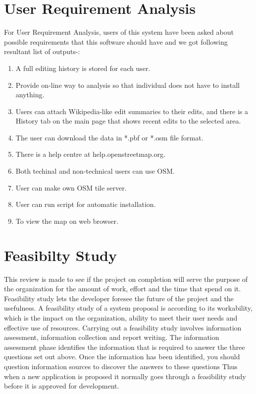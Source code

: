 \section{User Requirement Analysis}
For User Requirement Analysis, users of this system have been asked about
possible requirements that this software should have and we got following
resultant list of outputs-:
\begin{enumerate}
\item A full editing history is stored for each user.
\item Provide on-line way to analysis so that individual does not have to
install anything.
\item Users can attach Wikipedia-like edit summaries to their edits, and there is a History tab on the main page that shows recent edits to the selected area.
\item The user can download the data in *.pbf or *.osm file format.
\item There is a help centre at help.openstreetmap.org.
\item Both techinal and non-technical users can use OSM.
\item User can make own OSM tile server.
\item User can run script for automatic installation.
\item To view the map on web browser.

\end{enumerate}



\section{Feasibilty Study}
This review is made to see if the project on completion will serve the purpose of the organization for the amount of work, effort and the time that spend on it. Feasibility study lets the developer foresee the future of the project and the usefulness. A feasibility study of a system proposal is according to its workability, which is the impact on the organization, ability to meet their user needs and effective use of resources. Carrying out a feasibility study involves information assessment, information collection and report writing. The information assessment phase identifies the information that is required to answer the three questions set out above. Once the information has been identified, you should question information sources to discover the answers to these questions Thus when a new application is proposed it normally goes through a feasibility study before it is approved for development.\\

